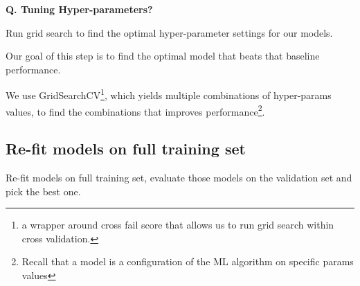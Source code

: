 \begin{frame}[fragile]{\textbf{Q. Tuning Hyper-parameters?}}
  \begin{wideitemize}
    \item Run grid search to find the optimal hyper-parameter settings for our models.
    \item Our goal of this step is to find the optimal model that beats that baseline performance.
    \item We use GridSearchCV\footnote{a wrapper around cross fail score that allows us to
    run grid search within cross validation.}, which yields multiple combinations of hyper-params
    values, to find the combinations that improves performance\footnote{Recall that a model is a
    configuration of the ML algorithm on specific params values}.
  \end{wideitemize}
\end{frame}

\subsection{Re-fit models on full training set}
\begin{transitionsubframe}
  \begin{center}
    \Huge Re-fit models on full training set, evaluate those models
    on the validation set and pick the best one.
  \end{center}
\end{transitionsubframe}

